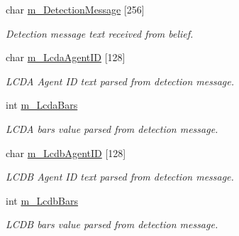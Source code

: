 \begin{DoxyCompactItemize}
\item 
\hypertarget{class_anaconda_detection_belief_ad0dd18df8bfdde94ba3ab686c68b8d2a}{
char \hyperlink{class_anaconda_detection_belief_ad0dd18df8bfdde94ba3ab686c68b8d2a}{m\_\-DetectionMessage} \mbox{[}256\mbox{]}}
\label{class_anaconda_detection_belief_ad0dd18df8bfdde94ba3ab686c68b8d2a}

\begin{DoxyCompactList}\small\item\em Detection message text received from belief. \end{DoxyCompactList}\item 
\hypertarget{class_anaconda_detection_belief_afd9ad715ece3d9686ff605bdc391ed67}{
char \hyperlink{class_anaconda_detection_belief_afd9ad715ece3d9686ff605bdc391ed67}{m\_\-LcdaAgentID} \mbox{[}128\mbox{]}}
\label{class_anaconda_detection_belief_afd9ad715ece3d9686ff605bdc391ed67}

\begin{DoxyCompactList}\small\item\em LCDA Agent ID text parsed from detection message. \end{DoxyCompactList}\item 
\hypertarget{class_anaconda_detection_belief_a360a0badb6433bf68653659c82141f2e}{
int \hyperlink{class_anaconda_detection_belief_a360a0badb6433bf68653659c82141f2e}{m\_\-LcdaBars}}
\label{class_anaconda_detection_belief_a360a0badb6433bf68653659c82141f2e}

\begin{DoxyCompactList}\small\item\em LCDA bars value parsed from detection message. \end{DoxyCompactList}\item 
\hypertarget{class_anaconda_detection_belief_a1e284fecbd403df34a20011a34b4c73d}{
char \hyperlink{class_anaconda_detection_belief_a1e284fecbd403df34a20011a34b4c73d}{m\_\-LcdbAgentID} \mbox{[}128\mbox{]}}
\label{class_anaconda_detection_belief_a1e284fecbd403df34a20011a34b4c73d}

\begin{DoxyCompactList}\small\item\em LCDB Agent ID text parsed from detection message. \end{DoxyCompactList}\item 
\hypertarget{class_anaconda_detection_belief_a3ea4b218b249e54227c21989cfd2ab30}{
int \hyperlink{class_anaconda_detection_belief_a3ea4b218b249e54227c21989cfd2ab30}{m\_\-LcdbBars}}
\label{class_anaconda_detection_belief_a3ea4b218b249e54227c21989cfd2ab30}

\begin{DoxyCompactList}\small\item\em LCDB bars value parsed from detection message. \end{DoxyCompactList}\end{DoxyCompactItemize}


